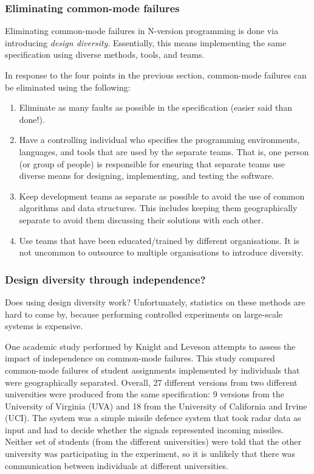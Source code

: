 \subsubsection*{Eliminating common-mode failures}

Eliminating common-mode failures in N-version programming is done via introducing \emph{design diversity}. Essentially, this means implementing the same specification using diverse methods, tools, and teams.

In response to the four points in the previous section, common-mode failures can be eliminated using the following:

\begin{enumerate}

\item Eliminate as many faults as possible in the specification (easier said than done!).

\item Have a controlling individual who specifies the programming environments, languages, and tools that are used by the separate teams. That is, one person (or group of people) is responsible for ensuring that separate teams use diverse means for designing, implementing, and testing the software.

\item Keep development teams as separate as possible to avoid the use of common algorithms and data structures. This includes keeping them geographically separate to avoid them discussing their solutions with each other.

\item Use teams that have been educated/trained by different organisations. It is not uncommon to outsource to multiple organisations to introduce diversity.

\end{enumerate}


\subsubsection*{Design diversity through independence?}

Does using design diversity work? Unfortunately, statistics on these methods are hard to come by, because performing controlled experiments on large-scale systems is expensive.

One academic study performed by Knight and Leveson \cite{knight86} attempts to assess the impact of independence on common-mode failures. This study compared common-mode failures of student assignments implemented by individuals that were geographically separated. Overall, 27 different versions from two different universities were produced from the same specification: 9 versions from the University of Virginia (UVA) and 18 from the University of California and Irvine (UCI). The system was a simple missile defence system that took radar data as input and had to decide whether the signals represented incoming missiles. Neither set of students (from the different universities) were told that the other university was participating in the experiment, so it is unlikely that there was communication between individuals at different universities. 

